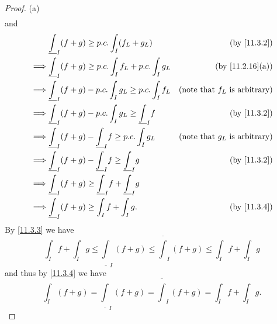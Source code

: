 \begin{proof}{(a)}
\begin{align*}
  \end{align*}
  and
  \begin{align*}
             & \underline{\int}_I (f + g) \geq p.c. \int_I (f_L + g_L)                     & \text{(by \cref{11.3.2})}               \\
    \implies & \underline{\int}_I (f + g) \geq p.c. \int_I f_L + p.c. \int_I g_L           & \text{(by \cref{11.2.16}(a))}           \\
    \implies & \underline{\int}_I (f + g) - p.c. \int_I g_L \geq p.c. \int_I f_L           & \text{(note that \(f_L\) is arbitrary)} \\
    \implies & \underline{\int}_I (f + g) - p.c. \int_I g_L \geq \underline{\int}_I f      & \text{(by \cref{11.3.2})}               \\
    \implies & \underline{\int}_I (f + g) - \underline{\int}_I f \geq p.c. \int_I g_L      & \text{(note that \(g_L\) is arbitrary)} \\
    \implies & \underline{\int}_I (f + g) - \underline{\int}_I f \geq \underline{\int}_I g & \text{(by \cref{11.3.2})}               \\
    \implies & \underline{\int}_I (f + g) \geq \underline{\int}_I f + \underline{\int}_I g &                                         \\
    \implies & \underline{\int}_I (f + g) \geq \int_I f + \int_I g.                        & \text{(by \cref{11.3.4})}
  \end{align*}
  By \cref{11.3.3} we have
  \[
    \int_I f + \int_I g \leq \underline{\int}_I (f + g) \leq \overline{\int}_I (f + g) \leq \int_I f + \int_I g
  \]
  and thus by \cref{11.3.4} we have
  \[
    \int_I (f + g) = \underline{\int}_I (f + g) = \overline{\int}_I (f + g) = \int_I f + \int_I g.
  \]
\end{proof}

